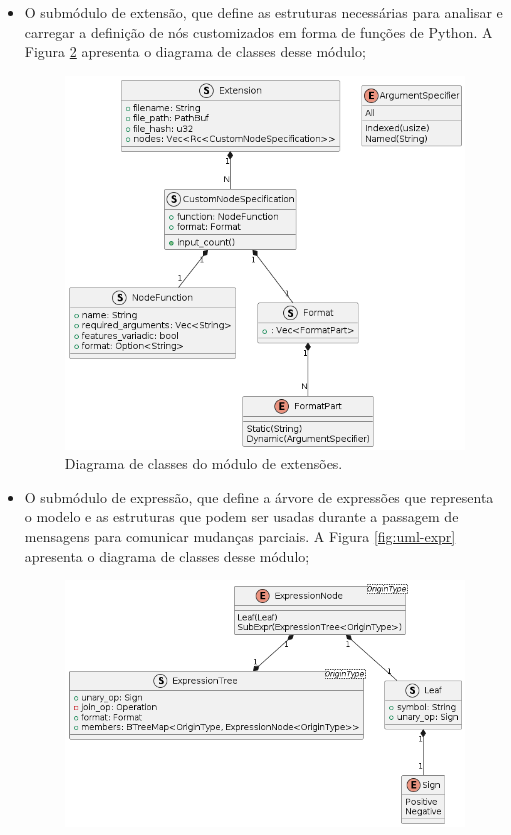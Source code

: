 \documentclass[
	12pt,				%
	openright,			%
	oneside,			%
	a4paper,			%
	main=brazil,
	english,			%
	]{ufsj-abntex2}
\begin{document}
\begin{itemize}
\begin{figure}[h]
        \label{fig:uml-nodes}
    \end{figure}
    \item O submódulo de extensão, que define as estruturas necessárias para analisar e carregar a definição de nós customizados em forma de funções de Python. A Figura \ref{fig:uml-extensions} apresenta o diagrama de classes desse módulo;
    \begin{figure}[h]
        \centering
        \includegraphics[scale=0.45]{diagrams/img/extensions.png} 
        \caption{Diagrama de classes do módulo de extensões.}
        \label{fig:uml-extensions}
    \end{figure}
    \item O submódulo de expressão, que define a árvore de expressões que representa o modelo e as estruturas que podem ser usadas durante a passagem de mensagens para comunicar mudanças parciais. A Figura \ref{fig:uml-expr} apresenta o diagrama de classes desse módulo;
    \begin{figure}[h]
        \centering
        \includegraphics[scale=0.6]{diagrams/img/exprtree.png} 

\end{figure}
\end{itemize}
\end{document}
